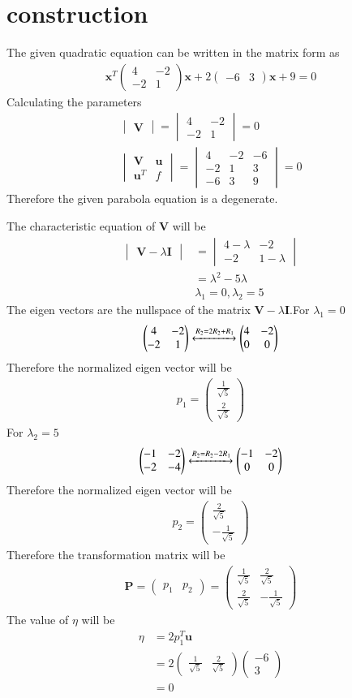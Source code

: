 \documentclass[journal,12pt,twocolumn]{IEEEtran}
\newcommand{\myvec}[1]{\ensuremath{\begin{pmatrix}#1\end{pmatrix}}}
\newcommand{\mydet}[1]{\ensuremath{\begin{vmatrix}#1\end{vmatrix}}}
\numberwithin{equation}{subsection}
\let\vec\mathbf
\begin{document}
\section{construction}
The given quadratic equation can be written in the matrix form as
\begin{align}
    \vec{x}^T\myvec{4&-2\\-2&1}\vec{x}+2\myvec{-6&3}\vec{x}+9=0\label{eq:1}
\end{align}
Calculating the parameters
\begin{align}
    \mydet{\vec{V}}=\mydet{4&-2\\-2&1}=0\\
    \mydet{\vec{V}&\vec{u}\\\vec{u}^T&f}=\mydet{4&-2&-6\\-2&1&3\\-6&3&9}=0
\end{align}
Therefore the given parabola equation is a degenerate.\par
The characteristic equation of $\vec{V}$ will be
\begin{align}
    \mydet{\vec{V}-\lambda\vec{I}}&=\mydet{4-\lambda&-2\\-2&1-\lambda}\\
    &=\lambda^2-5\lambda\\
    &\lambda_1=0,\lambda_2=5
\end{align}
The eigen vectors are the nullspace of the matrix $\vec{V}-\lambda\vec{I}$.For $\lambda_1=0$
\begin{align}
    \myvec{4&-2\\-2&1}\xleftrightarrow{R_2=2R_2+R_1}\myvec{4&-2\\0&0}
\end{align}
Therefore the normalized eigen vector will be
\begin{align}
    p_1=\myvec{\frac{1}{\sqrt{5}}\\\frac{2}{\sqrt{5}}}
\end{align}
For $\lambda_2=5$
\begin{align}
    \myvec{-1&-2\\-2&-4}\xleftrightarrow{R_2=R_2-2R_1}\myvec{-1&-2\\0&0}
\end{align}
Therefore the normalized eigen vector will be
\begin{align}
    p_2=\myvec{\frac{2}{\sqrt{5}}\\-\frac{1}{\sqrt{5}}}
\end{align}
Therefore the transformation matrix will be
\begin{align}
    \vec{P}=\myvec{p_1&p_2}=\myvec{\frac{1}{\sqrt{5}}&\frac{2}{\sqrt{5}}\\\frac{2}{\sqrt{5}}&-\frac{1}{\sqrt{5}}}
\end{align}
The value of $\eta$ will be
\begin{align}
    \eta&=2p_1^T\vec{u}\\
    &=2\myvec{\frac{1}{\sqrt{5}}&\frac{2}{\sqrt{5}}}\myvec{-6\\3}\\
    &=0
\end{align}
\end{document}
